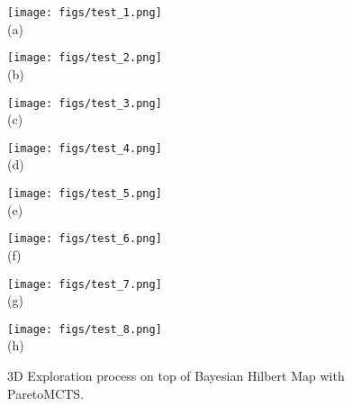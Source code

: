 \begin{figure}[h] \vspace{-10pt}
    \begin{minipage}[tb]{0.5\linewidth}
        \centering
        \texttt{[image: figs/test\_1.png]}\\(a)
        \label{fig:test_1}
    \end{minipage}
    \begin{minipage}[tb]{0.5\linewidth}
        \centering
        \texttt{[image: figs/test\_2.png]}\\(b)
        \label{fig:test_2}
    \end{minipage}
    \begin{minipage}[tb]{0.5\linewidth}
        \centering
        \texttt{[image: figs/test\_3.png]}\\(c)
        \label{fig:test_3}
    \end{minipage}
    \begin{minipage}[tb]{0.5\linewidth}
        \centering
        \texttt{[image: figs/test\_4.png]}\\(d)
        \label{fig:test_4}
    \end{minipage}
    \begin{minipage}[tb]{0.5\linewidth}
        \centering
        \texttt{[image: figs/test\_5.png]}\\(e)
        \label{fig:test_5}
    \end{minipage}
    \begin{minipage}[tb]{0.5\linewidth}
        \centering
        \texttt{[image: figs/test\_6.png]}\\(f)
        \label{fig:test_6}
    \end{minipage}
    \begin{minipage}[tb]{0.5\linewidth}
        \centering
        \texttt{[image: figs/test\_7.png]}\\(g)
        \label{fig:test_7}
    \end{minipage}
    \begin{minipage}[tb]{0.5\linewidth}
        \centering
        \texttt{[image: figs/test\_8.png]}\\(h)
        \label{fig:test_8}
    \end{minipage}
    \caption{\small 
            3D Exploration process on top of Bayesian Hilbert Map with ParetoMCTS. \vspace{-10pt}
    }
    \label{fig:exploration}
\end{figure}


